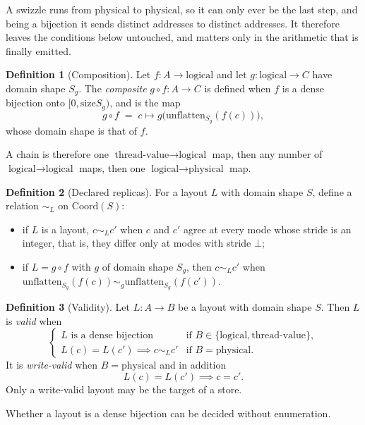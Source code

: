 \documentclass[11pt]{article}
\theoremstyle{definition}
\newtheorem{definition}{Definition}
\newcommand{\size}{\mathrm{size}}
\newcommand{\logical}{\textrm{logical}}
\newcommand{\physical}{\textrm{physical}}
\newcommand{\tv}{\textrm{thread-value}}
\begin{document}
A swizzle runs from $\physical$ to $\physical$, so it can only ever be the last
step, and being a bijection it sends distinct addresses to distinct addresses.
It therefore leaves the conditions below untouched, and matters only in the
arithmetic that is finally emitted.

\begin{definition}[Composition]\label{def:compose}
Let $f : A \to \logical$ and let $g : \logical \to C$ have domain shape $S_g$.
The \emph{composite} $g \circ f : A \to C$ is defined when $f$ is a dense
bijection onto $[0, \size S_g)$, and is the map
\[
g \circ f \;=\; c \mapsto g\big(\mathrm{unflatten}_{S_g}(f(c))\big),
\]
whose domain shape is that of $f$.
\end{definition}

A chain is therefore one $\tv \to \logical$ map, then any number of
$\logical \to \logical$ maps, then one $\logical \to \physical$ map.

\begin{definition}[Declared replicas]\label{def:replica}
For a layout $L$ with domain shape $S$, define a relation $\sim_L$ on
$\mathrm{Coord}(S)$:
\begin{itemize}
\item if $L$ is a layout, $c \sim_L c'$ when $c$ and $c'$ agree at every
mode whose stride is an integer, that is, they differ only at modes
with stride $\bot$;
\item if $L = g \circ f$ with $g$ of domain shape $S_g$, then $c \sim_L c'$ when
$\mathrm{unflatten}_{S_g}(f(c)) \sim_g \mathrm{unflatten}_{S_g}(f(c'))$.
\end{itemize}
\end{definition}

\begin{definition}[Validity]\label{def:validity}\label{sec:validity}
Let $L : A \to B$ be a layout with domain shape $S$. Then $L$ is \emph{valid}
when
\[
\begin{cases}
L \text{ is a dense bijection}
  & \text{if } B \in \{\logical, \tv\},\\[2pt]
L(c) = L(c') \implies c \sim_L c'
  & \text{if } B = \physical.
\end{cases}
\]
It is \emph{write-valid} when $B = \physical$ and in addition
\[
L(c) = L(c') \implies c = c'.
\]
Only a write-valid layout may be the target of a store.
\end{definition}

Whether a layout is a dense bijection can be decided without enumeration.
\end{document}
